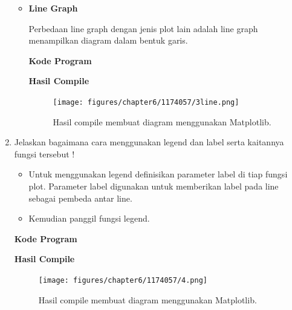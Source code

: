 \begin{enumerate}
\begin{itemize}
				\item \textbf{Line Graph}
				
				Perbedaan line graph dengan jenis plot lain adalah line graph menampilkan diagram dalam bentuk garis.
				
				\textbf{Kode Program}
				
				
				
				\textbf{Hasil Compile}
				
				\begin{figure}[H]
					\texttt{[image: figures/chapter6/1174057/3line.png]}
					\centering
					\caption{Hasil compile membuat diagram menggunakan Matplotlib.}
				\end{figure}
				
			\end{itemize}
		
		\item Jelaskan bagaimana cara menggunakan legend dan label serta kaitannya fungsi tersebut !
			\begin{itemize}
				\item Untuk menggunakan legend definisikan parameter label di tiap fungsi plot. Parameter label digunakan untuk memberikan label pada line sebagai pembeda antar line.
				
				
				
				\item Kemudian panggil fungsi legend.
				
				
			\end{itemize}

			\hfill \break
			\textbf{Kode Program}

			

			\hfill \break
			\textbf{Hasil Compile}

			\begin{figure}[H]
				\texttt{[image: figures/chapter6/1174057/4.png]}
				\centering
				\caption{Hasil compile membuat diagram menggunakan Matplotlib.}
			\end{figure}
	

\end{enumerate}
